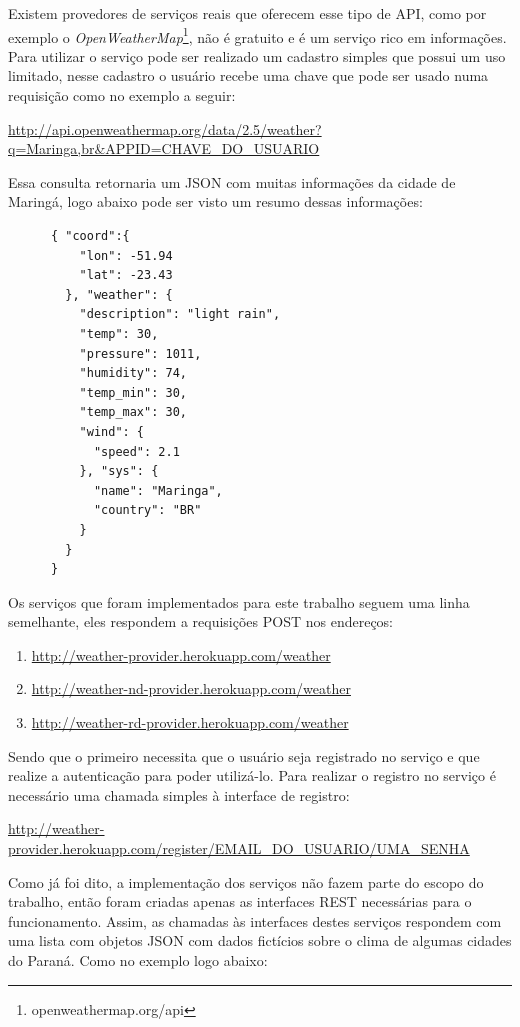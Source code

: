Existem provedores de serviços reais que oferecem esse tipo de API, como por exemplo o \textit{OpenWeatherMap}\footnote{openweathermap.org/api}, não é gratuito e é um serviço rico em informações. Para utilizar o serviço pode ser realizado um cadastro simples que possui um uso limitado, nesse cadastro o usuário recebe uma chave que pode ser usado numa requisição como no exemplo a seguir:

\url{http://api.openweathermap.org/data/2.5/weather?q=Maringa,br&APPID=CHAVE_DO_USUARIO}

Essa consulta retornaria um JSON com muitas informações da cidade de Maringá, logo abaixo pode ser visto um resumo dessas informações:

\begin{footnotesize}
  \begin{verbatim}
      { "coord":{
          "lon": -51.94
          "lat": -23.43
        }, "weather": {
          "description": "light rain",
          "temp": 30,
          "pressure": 1011,
          "humidity": 74,
          "temp_min": 30,
          "temp_max": 30,
          "wind": {
            "speed": 2.1
          }, "sys": {
            "name": "Maringa",
            "country": "BR"
          }
        }
      }
  \end{verbatim}
\end{footnotesize}

Os serviços que foram implementados para este trabalho seguem uma linha semelhante, eles respondem a requisições POST nos endereços:
\begin{footnotesize}
  \begin{enumerate}
  \item \url{http://weather-provider.herokuapp.com/weather}
  \item \url{http://weather-nd-provider.herokuapp.com/weather}
  \item \url{http://weather-rd-provider.herokuapp.com/weather}
  \end{enumerate}
\end{footnotesize}

Sendo que o primeiro necessita que o usuário seja registrado no serviço e que realize a autenticação para poder utilizá-lo. Para realizar o registro no serviço é necessário uma chamada simples à interface de registro:

\url{http://weather-provider.herokuapp.com/register/EMAIL_DO_USUARIO/UMA_SENHA}

Como já foi dito, a implementação dos serviços não fazem parte do escopo do trabalho, então foram criadas apenas as interfaces REST necessárias para o funcionamento. Assim, as chamadas às interfaces destes serviços respondem com uma lista com objetos JSON com dados fictícios sobre o clima de algumas cidades do Paraná. Como no exemplo logo abaixo:

